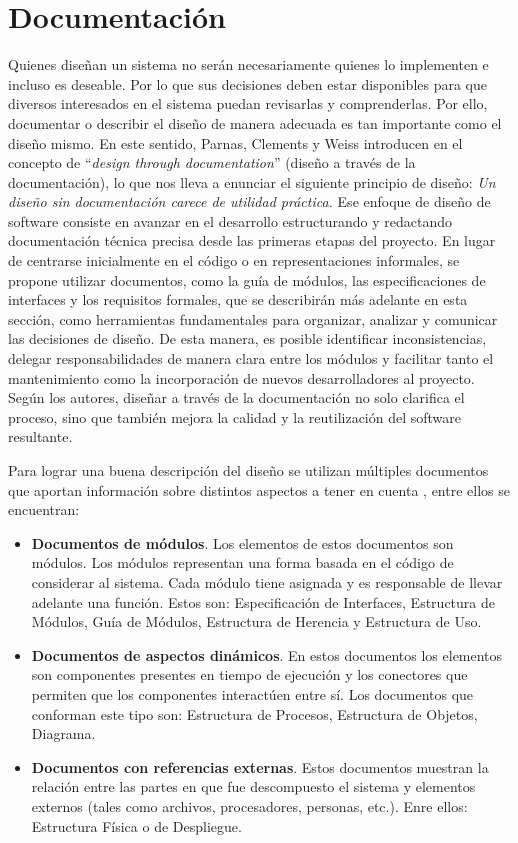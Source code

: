 \section{Documentación}
\label{secDocumentacion}

Quienes diseñan un sistema no serán necesariamente quienes lo implementen e incluso es deseable. Por lo que sus decisiones deben estar disponibles para que diversos interesados en el sistema puedan revisarlas y comprenderlas. Por ello, documentar o describir el diseño de manera adecuada es tan importante como el diseño mismo. En este sentido, Parnas, Clements y Weiss introducen en el concepto de ``\textit{design through documentation}'' (diseño a través de la documentación), lo que nos lleva a enunciar el siguiente principio de diseño: \textit{Un diseño sin documentación carece de utilidad práctica.} Ese enfoque de diseño de software consiste en avanzar en el desarrollo estructurando y redactando documentación técnica precisa desde las primeras etapas del proyecto. En lugar de centrarse inicialmente en el código o en representaciones informales, se propone utilizar documentos, como la guía de módulos, las especificaciones de interfaces y los requisitos formales, que se describirán más adelante en esta sección, como herramientas fundamentales para organizar, analizar y comunicar las decisiones de diseño. De esta manera, es posible identificar inconsistencias, delegar responsabilidades de manera clara entre los módulos y facilitar tanto el mantenimiento como la incorporación de nuevos desarrolladores al proyecto. Según los autores, diseñar a través de la documentación no solo clarifica el proceso, sino que también mejora la calidad y la reutilización del software resultante.

Para lograr una buena descripción del diseño se utilizan múltiples documentos que aportan información sobre distintos aspectos a tener en cuenta \cite{ClementsEtAl2010}, entre ellos se encuentran:

\begin{itemize}
\item \textbf{Documentos de módulos}. Los elementos de estos documentos son módulos. Los módulos representan una forma basada en el código de considerar al sistema. Cada módulo tiene asignada y es responsable de llevar adelante una función. Estos son: Especificación de Interfaces, Estructura de Módulos, Guía de Módulos, Estructura de Herencia y Estructura de Uso.
\item \textbf{Documentos de aspectos dinámicos}. En estos documentos los elementos son componentes presentes en tiempo de ejecución y los conectores que permiten que los componentes interactúen entre sí. Los documentos que conforman este tipo son: Estructura de Procesos, Estructura de Objetos, Diagrama.
\item \textbf{Documentos con referencias externas}. Estos documentos muestran la relación entre las partes en que fue descompuesto el sistema y elementos externos (tales como archivos, procesadores, personas, etc.). Enre ellos: Estructura Física o de Despliegue.
\end{itemize}

